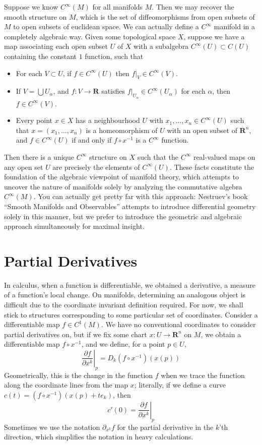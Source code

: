 Suppose we know $C^\infty(M)$ for all manifolds $M$. Then we may recover the smooth structure on $M$, which is the set of diffeomorphisms from open subsets of $M$ to open subsets of euclidean space. We can actually define a $C^\infty$ manifold in a completely algebraic way. Given some topological space $X$, suppose we have a map associating each open subset $U$ of $X$ with a subalgebra $C^\infty(U) \subset C(U)$ containing the constant $1$ function, such that
%
\begin{itemize}
    \item For each $V \subset U$, if $f \in C^\infty(U)$ then $f|_V \in C^\infty(V)$.
    \item If $V = \bigcup U_\alpha$, and $f: V \to \mathbf{R}$ satisfies $f|_{U_\alpha} \in C^\infty(U_\alpha)$ for each $\alpha$, then $f \in C^\infty(V)$.
    \item Every point $x \in X$ has a neighbourhood $U$ with $x_1, \dots, x_n \in C^\infty(U)$ such that $x = (x_1, \dots, x_n)$ is a homeomorphism of $U$ with an open subset of $\mathbf{R}^n$, and $f \in C^\infty(U)$ if and only if $f \circ x^{-1}$ is a $C^\infty$ function.
\end{itemize}
%
Then there is a unique $C^\infty$ structure on $X$ such that the $C^\infty$ real-valued maps on any open set $U$ are precisely the elements of $C^\infty(U)$. These facts constitute the foundation of the algebraic viewpoint of manifold theory, which attempts to uncover the nature of manifolds solely by analyzing the commutative algebra $C^\infty(M)$. You can actually get pretty far with this approach: Nestruev's book ``Smooth Manifolds and Observables'' attempts to introduce differential geometry solely in this manner, but we prefer to introduce the geometric and algebraic approach simultaneously for maximal insight.

\section{Partial Derivatives}

In calculus, when a function is differentiable, we obtained a derivative, a measure of a function's local change. On manifolds, determining an analogous object is difficult due to the coordinate invariant definition required. For now, we shall stick to structures corresponding to some particular set of coordinates. Consider a differentiable map $f \in C^1(M)$. We have no conventional coordinates to consider partial derivatives on, but if we fix some chart $x:U \to \mathbf{R}^n$ on $M$, we obtain a differentiable map $f \circ x^{-1}$, and we define, for a point $p \in U$,
%
\[ \left. \frac{\partial f}{\partial x^k} \right|_p = D_k(f \circ x^{-1})(x(p)) \]
%
Geometrically, this is the change in the function $f$ when we trace the function along the coordinate lines from the map $x$; literally, if we define a curve $c(t) = (f \circ x^{-1})(x(p) + te_k)$, then
%
\[ c'(0) = \left.\frac{\partial f}{\partial x^k}\right|_p \]
%
Sometimes we use the notation $\partial_{x^k} f$ for the partial derivative in the $k$'th direction, which simplifies the notation in heavy calculations.

